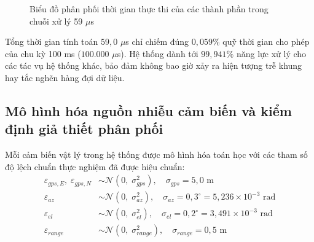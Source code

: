 \begin{figure}[H]
\centering
{}
\caption{Biểu đồ phân phối thời gian thực thi của các thành phần trong chuỗi xử lý 59 $\mu$s}
\label{fig:timing-bar-chart}
\end{figure}

Tổng thời gian tính toán $59{,}0$ $\mu$s chỉ chiếm đúng $0{,}059\%$ quỹ thời gian cho phép của chu kỳ 100 ms ($100.000$ $\mu$s). Hệ thống dành tới $99{,}941\%$ năng lực xử lý cho các tác vụ hệ thống khác, bảo đảm không bao giờ xảy ra hiện tượng trễ khung hay tắc nghẽn hàng đợi dữ liệu.

\subsection{Mô hình hóa nguồn nhiễu cảm biến và kiểm định giả thiết phân phối}

\hspace{0.5cm} Mỗi cảm biến vật lý trong hệ thống được mô hình hóa toán học với các tham số độ lệch chuẩn thực nghiệm đã được hiệu chuẩn:
\begin{align}
\varepsilon_{gps, E}, \; \varepsilon_{gps, N} &\sim \mathcal{N}(0, \; \sigma_{gps}^2), \quad \sigma_{gps} = 5{,}0 \text{ m} \label{eq:gps-noise-model} \\
\varepsilon_{az} &\sim \mathcal{N}(0, \; \sigma_{az}^2), \quad \sigma_{az} = 0{,}3^\circ = 5{,}236 \times 10^{-3} \text{ rad} \label{eq:az-noise-model} \\
\varepsilon_{el} &\sim \mathcal{N}(0, \; \sigma_{el}^2), \quad \sigma_{el} = 0{,}2^\circ = 3{,}491 \times 10^{-3} \text{ rad} \label{eq:el-noise-model} \\
\varepsilon_{range} &\sim \mathcal{N}(0, \; \sigma_{range}^2), \quad \sigma_{range} = 0{,}5 \text{ m} \label{eq:range-noise-model}
\end{align}

